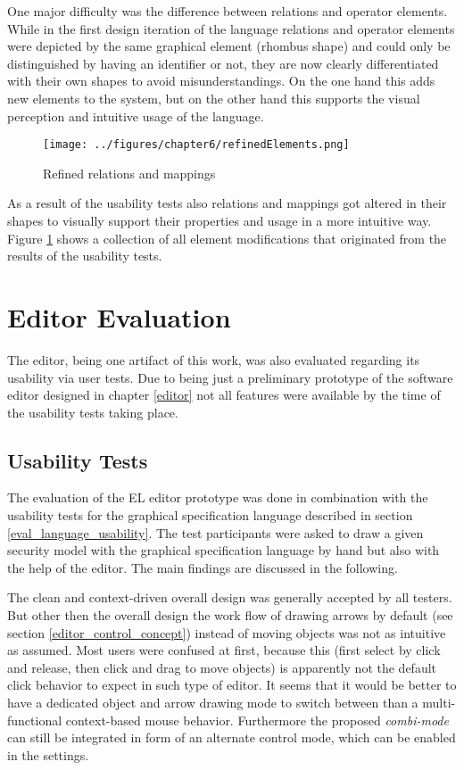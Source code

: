 \documentclass[twoside, openright, 12pt]{book}
\begin{document}
One major difficulty was the difference between relations and operator elements.
While in the first design iteration of the language relations and operator elements were depicted by the same graphical element (rhombus shape) and could only be distinguished by having an identifier or not, they are now clearly differentiated with their own shapes to avoid misunderstandings.
On the one hand this adds new elements to the system, but on the other hand this supports the visual perception and intuitive usage of the language.

\begin{figure}[htb]
	\centering
	\texttt{[image: ../figures/chapter6/refinedElements.png]}
	\caption{Refined relations and mappings}
	\label{fig:refinedElements}
\end{figure}

As a result of the usability tests also relations and mappings got altered in their shapes to visually support their properties and usage in a more intuitive way.
Figure \ref{fig:refinedElements} shows a collection of all element modifications that originated from the results of the usability tests.



\section{Editor Evaluation}
\label{eval_editor}
The editor, being one artifact of this work, was also evaluated regarding its usability via user tests.
Due to being just a preliminary prototype of the software editor designed in chapter \ref{editor} not all features were available by the time of the usability tests taking place.



\subsection{Usability Tests}
\label{eval_editor_usability}
The evaluation of the EL editor prototype was done in combination with the usability tests for the graphical specification language described in section \ref{eval_language_usability}.
The test participants were asked to draw a given security model with the graphical specification language by hand but also with the help of the editor.
The main findings are discussed in the following.

The clean and context-driven overall design was generally accepted by all testers. 
But other then the overall design the work flow of drawing arrows by default (see section \ref{editor_control_concept}) instead of moving objects was not as intuitive as assumed.
Most users were confused at first, because this (first select by click and release, then click and drag to move objects) is apparently not the default click behavior to expect in such type of editor.
It seems that it would be better to have a dedicated object and arrow drawing mode to switch between than a multi-functional context-based mouse behavior.
Furthermore the proposed \textit{combi-mode} can still be integrated in form of an alternate control mode, which can be enabled in the settings.
\end{document}
